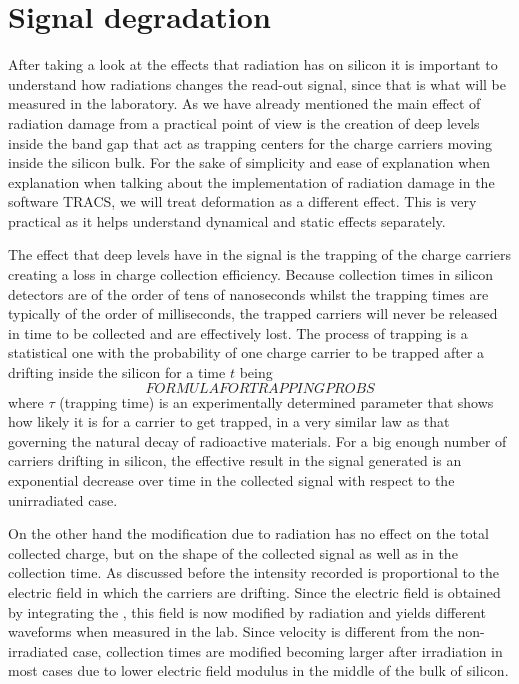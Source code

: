 \section{Signal degradation} %

After taking a look at the effects that radiation has on silicon it is important to understand how radiations changes the read-out signal, since that is what will be measured in the laboratory. As we have already mentioned the main effect of radiation damage from a practical point of view is the creation of deep levels inside the band gap that act as trapping centers for the charge carriers moving inside the silicon bulk. For the sake of simplicity and ease of explanation when explanation when talking about the implementation of radiation damage in the software TRACS, we will treat \neff deformation as a different effect. This is very practical as it helps understand dynamical and static effects separately. 

The effect that deep levels have in the signal is the trapping of the charge carriers creating a loss in charge collection efficiency. Because collection times in silicon detectors are of the order of tens of nanoseconds whilst the trapping times are typically of the order of milliseconds, the trapped carriers will never be released in time to be collected and are effectively lost. The process of trapping is a statistical one with the probability of one charge carrier to be trapped after a drifting inside the silicon for a time $t$ being  \[FORMULA FOR TRAPPING PROBS\] where $\tau$ (trapping time) is an experimentally determined parameter that shows how likely it is for a carrier to get trapped, in a very similar law as that governing the natural decay of radioactive materials. For a big enough number of carriers drifting in silicon, the effective result in the signal generated is an exponential decrease over time in the collected signal with respect to the unirradiated case. 

On the other hand the \neff modification due to radiation has no effect on the total collected charge, but on the shape of the collected signal as well as in the collection time. As discussed before the intensity recorded is proportional to the electric field in which the carriers are drifting. Since the electric field is obtained by integrating the \neff, this field is now modified by radiation and yields different waveforms when measured in the lab. Since velocity is different from the non-irradiated case, collection times are modified becoming larger after irradiation in most cases due to lower electric field modulus in the middle of the bulk of silicon. 


